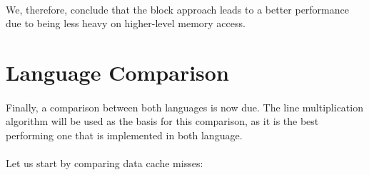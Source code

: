 \documentclass{report}
\begin{document}
				\paragraph{}We, therefore, conclude that the block approach leads to a better performance due to being less heavy on higher-level memory access.
			
		\section{Language Comparison}
		
			\paragraph{}Finally, a comparison between both languages is now due. The line multiplication algorithm will be used as the basis for this comparison, as it is the best performing one that is implemented in both language. 
			
			\paragraph{}Let us start by comparing data cache misses: 
			
\end{document}
